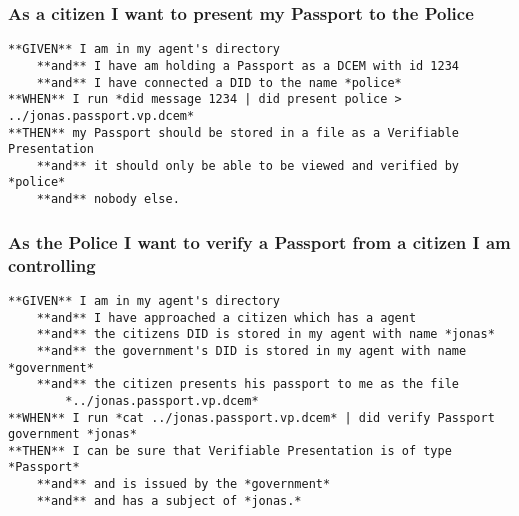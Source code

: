 \hypertarget{as-a-citizen-i-want-to-present-my-passport-to-the-police}{%
\subsubsection{As a citizen I want to present my Passport to the
Police}\label{as-a-citizen-i-want-to-present-my-passport-to-the-police}}

\begin{lstlisting}
**GIVEN** I am in my agent's directory
    **and** I have am holding a Passport as a DCEM with id 1234
    **and** I have connected a DID to the name *police*
**WHEN** I run *did message 1234 | did present police > ../jonas.passport.vp.dcem*
**THEN** my Passport should be stored in a file as a Verifiable Presentation
    **and** it should only be able to be viewed and verified by *police*
    **and** nobody else.
\end{lstlisting}

\hypertarget{as-the-police-i-want-to-verify-a-passport-from-a-citizen-i-am-controlling}{%
\subsubsection{As the Police I want to verify a Passport from a citizen
I am
controlling}\label{as-the-police-i-want-to-verify-a-passport-from-a-citizen-i-am-controlling}}

\begin{lstlisting}
**GIVEN** I am in my agent's directory
    **and** I have approached a citizen which has a agent
    **and** the citizens DID is stored in my agent with name *jonas*
    **and** the government's DID is stored in my agent with name *government*
    **and** the citizen presents his passport to me as the file 
        *../jonas.passport.vp.dcem*
**WHEN** I run *cat ../jonas.passport.vp.dcem* | did verify Passport government *jonas*
**THEN** I can be sure that Verifiable Presentation is of type *Passport*
    **and** and is issued by the *government*
    **and** and has a subject of *jonas.*
\end{lstlisting}
